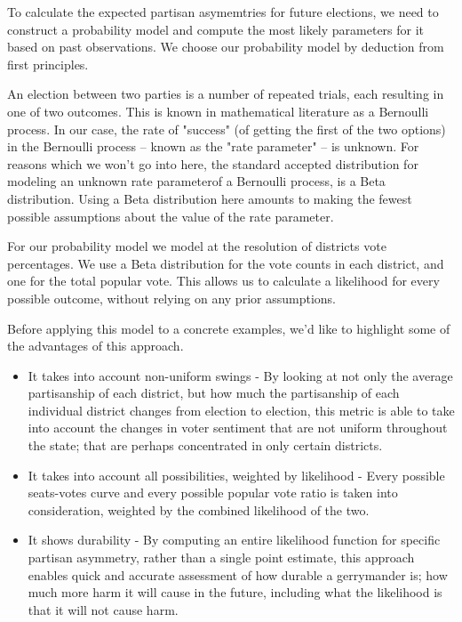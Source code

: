 \documentclass[preprint,12pt]{article}
\begin{document}
To calculate the expected partisan asymemtries for future elections, we need to construct a probability model and compute the most likely parameters for it based on past observations.
We choose our probability model by deduction from first principles.

An election between two parties is a number of repeated trials, each resulting in one of two outcomes.  This is known in mathematical literature as a Bernoulli process.
In our case, the rate of "success" (of getting the first of the two options) in the Bernoulli process -- known as the "rate parameter" -- is unknown.
For reasons which we won't go into here, the standard accepted distribution for modeling an unknown rate parameterof a Bernoulli process, is a Beta distribution.
Using a Beta distribution here amounts to making the fewest possible assumptions about the value of the rate parameter.

For our probability model we model at the resolution of districts vote percentages.
We use a Beta distribution for the vote counts in each district, and one for the total popular vote.
This allows us to calculate a likelihood for every possible outcome, without relying on any prior assumptions.

Before applying this model to a concrete examples, we'd like to highlight some of the advantages of this approach.

\begin{itemize}

\item It takes into account non-uniform swings - By looking at not only the average partisanship of each district, but how much the partisanship of each individual district changes from election to election, this metric is able to take into account the changes in voter sentiment that are not uniform throughout the state; that are perhaps concentrated in only certain districts.

\item It takes into account all possibilities, weighted by likelihood - Every possible seats-votes curve and every possible popular vote ratio is taken into consideration, weighted by the combined likelihood of the two.

\item It shows durability - By computing an entire likelihood function for specific partisan asymmetry, rather than a single point estimate, this approach enables quick and accurate assessment of how durable a gerrymander is; how much more harm it will cause in the future, including what the likelihood is that it will not cause harm.

\end{itemize}
\end{document}
